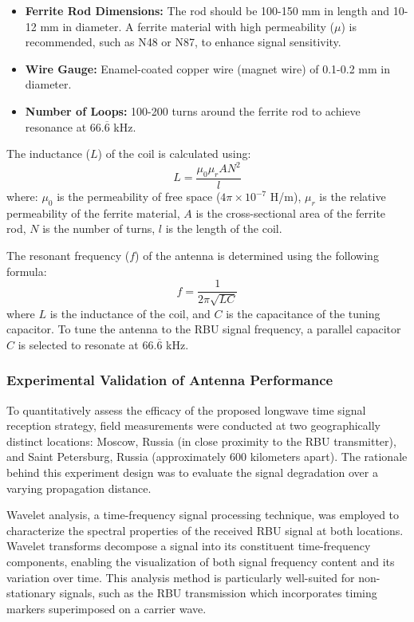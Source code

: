 \documentclass[12pt, a4paper]{extarticle}
\begin{document}
\begin{itemize}[noitemsep]
    \item \textbf{Ferrite Rod Dimensions:} The rod should be 100-150 mm in
        length and 10-12 mm in diameter. A ferrite material with high
        permeability (\(\mu\)) is recommended, such as N48 or N87, to enhance
        signal sensitivity.
    \item \textbf{Wire Gauge:} Enamel-coated copper wire (magnet wire) of
        0.1-0.2 mm in diameter.
    \item \textbf{Number of Loops:} 100-200 turns around the ferrite rod to
        achieve resonance at $66.\overline{6}$ kHz.
\end{itemize}

The inductance (\(L\)) of the coil is calculated using:
\[
L = \frac{\mu_0 \mu_r A N^2}{l}
\]
where:
 \( \mu_0 \) is the permeability of free space (\(4\pi \times 10^{-7}\) H/m),
 \( \mu_r \) is the relative permeability of the ferrite material,
 \( A \) is the cross-sectional area of the ferrite rod,
 \( N \) is the number of turns,
 \( l \) is the length of the coil.

The resonant frequency (\(f\)) of the antenna is determined using
the following formula:
\[
f = \frac{1}{2\pi \sqrt{L C}}
\]
where \( L \) is the inductance of the coil, and \( C \) is the capacitance of
the tuning capacitor.
To tune the antenna to the RBU signal frequency, a parallel capacitor \(C\)
is selected to resonate at $66.\overline{6}$ kHz.


\subsubsection{Experimental Validation of Antenna Performance}\label{section:antenna-recv}

To quantitatively assess the efficacy of the proposed longwave time signal
reception strategy, field measurements were conducted at two geographically
distinct locations: Moscow, Russia (in close proximity to the RBU transmitter),
and Saint Petersburg, Russia (approximately 600 kilometers apart). The
rationale behind this experiment design was to evaluate the signal degradation
over a varying propagation distance.

Wavelet analysis, a time-frequency signal processing technique, was employed to
characterize the spectral properties of the received RBU signal at both
locations. Wavelet transforms decompose a signal into its constituent
time-frequency components, enabling the visualization of both signal frequency
content and its variation over time. This analysis method is particularly
well-suited for non-stationary signals, such as the RBU transmission which
incorporates timing markers superimposed on a carrier wave.
\end{document}
